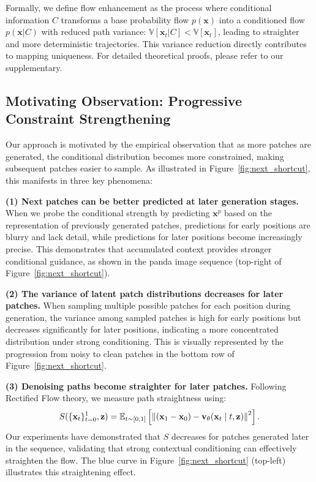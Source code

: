 \documentclass{article}
\theoremstyle{plain}
\theoremstyle{definition}
\theoremstyle{remark}
\begin{document}
Formally, we define flow enhancement as the process where conditional information $C$ transforms a base probability flow $p(\mathbf{x})$ into a conditioned flow $p(\mathbf{x}|C)$ with reduced path variance: $\mathbb{V}[\mathbf{x}_t|C] < \mathbb{V}[\mathbf{x}_t]$, leading to straighter and more deterministic trajectories. This variance reduction directly contributes to mapping uniqueness. For detailed theoretical proofs, please refer to our supplementary.

\subsection{Motivating Observation: Progressive Constraint Strengthening}
\label{subsec:key_observation}

Our approach is motivated by the empirical observation that as more patches are generated, the conditional distribution becomes more constrained, making subsequent patches easier to sample. As illustrated in Figure~\ref{fig:next_shortcut}, this manifests in three key phenomena: 

\textbf{(1) Next patches can be better predicted at later generation stages.} When we probe the conditional strength by predicting $\mathbf{x}^{p}$ based on the representation of previously generated patches, predictions for early positions are blurry and lack detail, while predictions for later positions become increasingly precise. This demonstrates that accumulated context provides stronger conditional guidance, as shown in the panda image sequence (top-right of Figure~\ref{fig:next_shortcut}).

\textbf{(2) The variance of latent patch distributions decreases for later patches.} When sampling multiple possible patches for each position during generation, the variance among sampled patches is high for early positions but decreases significantly for later positions, indicating a more concentrated distribution under strong conditioning. This is visually represented by the progression from noisy to clean patches in the bottom row of Figure~\ref{fig:next_shortcut}.

\textbf{(3) Denoising paths become straighter for later patches.} Following Rectified Flow theory, we measure path straightness using:
\begin{equation}
\small
S(\{\mathbf{x}_{t}\}_{t=0}^{1}, \mathbf{z}) = \mathbb{E}_{t \sim [0,1]} \left[ \left\| (\mathbf{x}_{1} - \mathbf{x}_{0}) - \mathbf{v}_{\theta}(\mathbf{x}_{t} \mid t, \mathbf{z}) \right\|^{2} \right].
\end{equation}
Our experiments have demonstrated that $S$ decreases for patches generated later in the sequence, validating that strong contextual conditioning can effectively straighten the flow. The blue curve in Figure~\ref{fig:next_shortcut} (top-left) illustrates this straightening effect.
\end{document}
